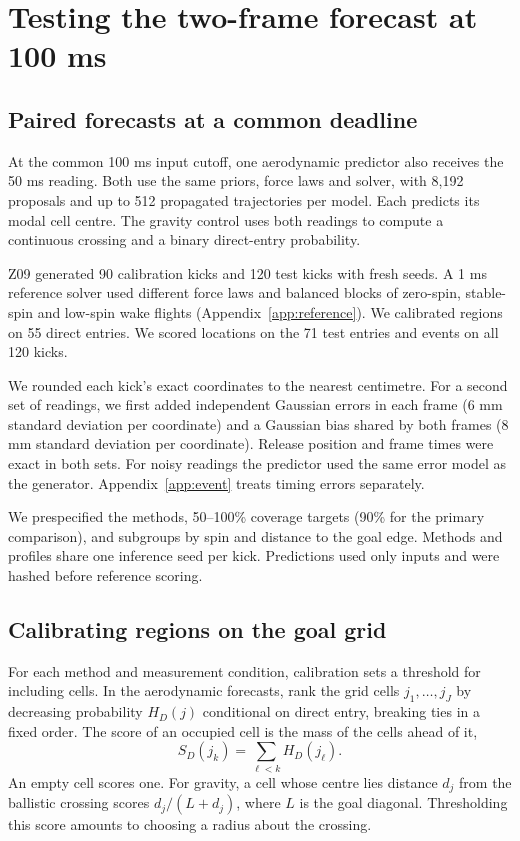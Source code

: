 \section{Testing the two-frame forecast at 100 ms}
\label{sec:coverage}

\subsection{Paired forecasts at a common deadline}
At the common 100 ms input cutoff, one aerodynamic predictor also receives the 50 ms reading. Both use the same priors, force laws and solver, with 8,192 proposals and up to 512 propagated trajectories per model. Each predicts its modal cell centre. The gravity control uses both readings to compute a continuous crossing and a binary direct-entry probability.

Z09 generated 90 calibration kicks and 120 test kicks with fresh seeds. A 1 ms reference solver used different force laws and balanced blocks of zero-spin, stable-spin and low-spin wake flights (Appendix~\ref{app:reference}). We calibrated regions on 55 direct entries. We scored locations on the 71 test entries and events on all 120 kicks.

We rounded each kick's exact coordinates to the nearest centimetre. For a second set of readings, we first added independent Gaussian errors in each frame (6 mm standard deviation per coordinate) and a Gaussian bias shared by both frames (8 mm standard deviation per coordinate). Release position and frame times were exact in both sets. For noisy readings the predictor used the same error model as the generator. Appendix~\ref{app:event} treats timing errors separately.

We prespecified the methods, 50--100\% coverage targets (90\% for the primary comparison), and subgroups by spin and distance to the goal edge. Methods and profiles share one inference seed per kick. Predictions used only inputs and were hashed before reference scoring.

\subsection{Calibrating regions on the goal grid}
For each method and measurement condition, calibration sets a threshold for including cells. In the aerodynamic forecasts, rank the grid cells \(j_1,\ldots,j_J\) by decreasing probability \(H_D(j)\) conditional on direct entry, breaking ties in a fixed order. The score of an occupied cell is the mass of the cells ahead of it,
\begin{equation}
 S_D(j_k)=\sum_{\ell<k}H_D(j_\ell).
 \label{eq:coverage-prefix}
\end{equation}
An empty cell scores one. For gravity, a cell whose centre lies distance \(d_j\) from the ballistic crossing scores \(d_j/(L+d_j)\), where \(L\) is the goal diagonal. Thresholding this score amounts to choosing a radius about the crossing.

